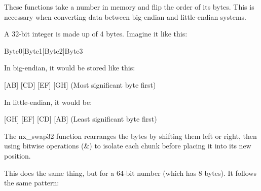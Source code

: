 \begin{NexMainBox}
	\begin{NexMainBox}[dark, crnA, title=\textbf{What Are These Functions Doing?}]
		These functions take a number in memory and flip the order of its bytes. This is necessary when converting data between big-endian and little-endian systems.
	\end{NexMainBox}

	\begin{NexMainBox}[dark, crnA, title=\textbf{How does nx\_swap32 work? (32-bit swap)}]
		A 32-bit integer is made up of 4 bytes. Imagine it like this:

		\begin{NexMainBox}[light]
		\begin{center}
		Byte0\hspace{1em}|\hspace{1em}Byte1\hspace{1em}|\hspace{1em}Byte2\hspace{1em}|\hspace{1em}Byte3
		\end{center}

	\end{NexMainBox}
		In big-endian, it would be stored like this:

		\begin{NexMainBox}[light]
		\begin{center}
		[AB] [CD] [EF] [GH] (Most significant byte first)
		\end{center}
	\end{NexMainBox}
		In little-endian, it would be:

		\begin{NexMainBox}[light]
		\begin{center}
		[GH] [EF] [CD] [AB] (Least significant byte first)
		\end{center}
	\end{NexMainBox}

		The nx\_swap32 function rearranges the bytes by shifting them left or right, then using bitwise operations (\&) to isolate each chunk before placing it into its new position.
	\end{NexMainBox}

	\begin{NexMainBox}[dark, crnA, title=\textbf{How does nx\_swap64 work? (64-bit swap)}]
		This does the same thing, but for a 64-bit number (which has 8 bytes). It follows the same pattern:


\end{NexMainBox}
\end{NexMainBox}

